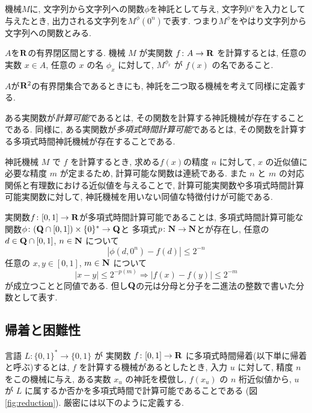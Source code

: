 機械$M$に, 
文字列から文字列への関数$\phi$を神託として与え, 
文字列$0 ^n$を入力として与えたとき, 
出力される文字列を$M ^\phi (0 ^n)$で表す. 
つまり$M ^\phi$をやはり文字列から文字列への関数とみる. 

\begin{definition}
$A$を$\mathbf R$の有界閉区間とする. 
機械 $M$ が実関数 $f \colon A \to \mathbf R$ を計算するとは,
任意の実数 $x \in A$, 任意の $x$ の名 $\phi_x$ に対して,
$M^{\phi_x}$ が $f(x)$ の名であること.
\end{definition}

$A$が$\mathbf R ^2$の有界閉集合であるときにも, 
神託を二つ取る機械を考えて同様に定義する. 

 ある実関数が\emph{計算可能}であるとは, その関数を計算する神託機械が存在することである.
 同様に, ある実関数が\emph{多項式時間計算可能}であるとは, その関数を計算する多項式時間神託機械が存在することである.

 神託機械 $M$ で $f$ を計算するとき, 求める$f (x)$の精度 $n$ に対して,
 $x$ の近似値に必要な精度 $m$ が定まるため,
 計算可能な関数は連続である.
 また $n$ と $m$ の対応関係と有理数における近似値を与えることで,
 計算可能実関数や多項式時間計算可能実関数に対して,
 神託機械を用いない同値な特徴付けが可能である.

\begin{lemma}
  \label{lem:type1representation}
  実関数$f\colon [0,1] \to \mathbf R$が多項式時間計算可能であることは, 
  多項式時間計算可能な
  関数$\phi \colon (\mathbf Q \cap [0, 1]) \times \{0\} ^* \to \mathbf Q$と
  多項式$p \colon \mathbf N \to \mathbf N$とが存在し, 
  任意の $d \in \mathbf Q \cap [0,1]$, $n \in \mathbf N$ について
  \begin{equation}
   |\phi(d, 0^n) - f(d)| \le 2^{-n} 
  \end{equation}
  任意の $x, y \in [0, 1]$, $m \in \mathbf N$ について
  \begin{equation}
   |x-y| \le 2^{-p(m)} \Rightarrow |f(x) - f(y)| \le 2^{-m} 
  \end{equation}
  が成立つことと同値である. 
但し$\mathbf Q$の元は分母と分子を二進法の整数で書いた分数として表す. 
\end{lemma}

\subsection{帰着と困難性}

 言語 $L \colon \{0, 1\} ^* \to \{0, 1\}$ が
 実関数 $f\colon [0,1] \to \mathbf R$ に多項式時間帰着(以下単に帰着と呼ぶ)するとは,
 $f$ を計算する機械があるとしたとき, 入力 $u$ に対して,
 精度 $n$ をこの機械に与え, ある実数 $x_u$ の神託を模倣し, $f(x_u)$ の $n$ 桁近似値から,
 $u$ が $L$ に属するか否かを多項式時間で計算可能であることである
 (図\ref{fig:reduction}).
 厳密には以下のように定義する.

